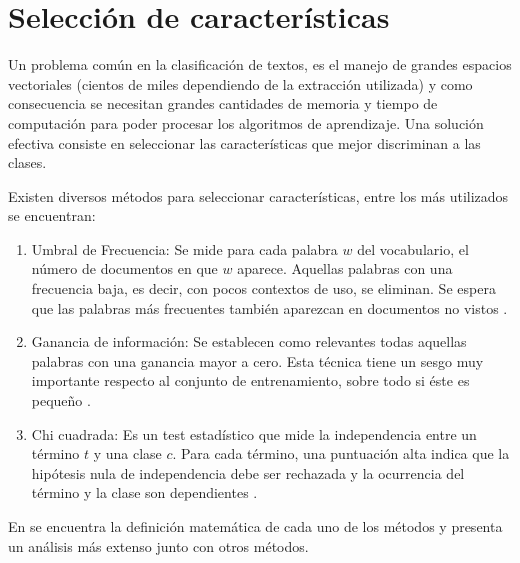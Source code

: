\section{Selección de características}

Un problema común en la clasificación de textos, es el manejo de grandes espacios vectoriales (cientos de miles dependiendo de la extracción utilizada) y como consecuencia se necesitan grandes cantidades de memoria y tiempo de computación para poder procesar los algoritmos de aprendizaje. Una solución efectiva consiste en seleccionar las características que mejor discriminan a las clases.

Existen diversos métodos para seleccionar características, entre los más utilizados se encuentran:

\begin{enumerate}
    \item Umbral de Frecuencia: Se mide para cada palabra $w$ del vocabulario, el número de documentos en que $w$ aparece. Aquellas palabras con una frecuencia baja, es decir, con pocos contextos de uso, se eliminan. Se espera que las palabras más frecuentes también aparezcan en documentos no vistos \citep{yang1997comparative}.
    
    \item Ganancia de información: Se establecen como relevantes todas aquellas palabras con una ganancia mayor a cero. Esta técnica tiene un sesgo muy importante respecto al conjunto de entrenamiento, sobre todo si éste es pequeño \citep{yang1997comparative}.  
    
    \item Chi cuadrada: Es un test estadístico que mide la independencia entre un término $t$ y una clase $c$. Para cada término, una puntuación alta indica que la hipótesis nula de independencia debe ser rechazada y la ocurrencia del término y la clase son dependientes \citep{yang1997comparative}.
\end{enumerate}

En \citep{yang1997comparative} se encuentra la definición matemática de cada uno de los métodos y \citep{forman2003extensive} presenta un análisis más extenso junto con otros métodos. 
